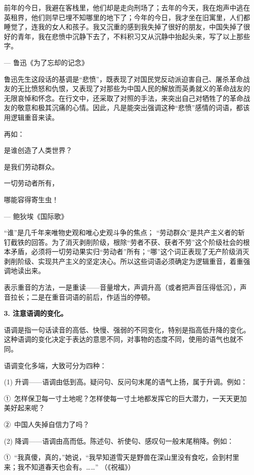 前年的今日，我避在客栈里，他们却是走向刑场了；去年的今天，我在炮声中逃在英租界，他们则早已埋不知哪里的地下了；今年的今日，我才坐在旧寓里，人们都睡觉了，连我的女人和孩子。我又沉重的感到我失掉了很好的朋友，中国失掉了很好的青年，我在悲愤中沉静下去了，不料积习又从沉静中抬起头来，写了以上那些字。
\begin{flushright}
	--- 鲁迅《为了忘却的记念》
\end{flushright}

鲁迅先生这段话的基调是“悲愤”，既表现了对国民党反动派迫害自己、屠杀革命战友的无比愤怒和仇恨，又表现了对那些为中国人民的解放而英勇就义的革命战友的无限哀悼和怀念。在行文中，还采取了对照的手法，来突出自己对牺牲了的革命战友的敬意和极其沉痛的心情。因此，凡是能突出强调这种“悲愤”感情的词语，都该用逻辑重音来读。

再如：

是谁创造了人类世界？

是我们劳动群众。

一切劳动者所有，

哪能容得寄生虫！
\begin{flushright}
	--- 鲍狄埃《国际歌》
\end{flushright}


“谁”是几千年来唯物史观和唯心史观斗争的焦点；
“劳动群众”是共产主义者的斩钉截铁的回答。为了消灭剥削阶级，根除“劳者不获、获者不劳”这个阶级社会的根本矛盾，必须将一切劳动果实归“劳动者”所有；“哪”这个词正表现了无产阶级消灭剥削阶级、实现共产主义的坚定决心。所以这些词语必须确定为逻辑重音，着重强调地读出来。

表示重音的方法，一是重读——音量增大，声调升高（或者把声音压得低沉），声音拉长；二是在重音词语的前后，作适当的停顿。

\textbf{3. 注意语调的变化。}

语调是指一句话读音的高低、快慢、强弱的不同变化，特别是指高低升降的变化。这种语调的变化决定于表达的意思不同，对事物的态度不同，使用的语气也就不同。

语调变化多端，大致可分为四种：

(1) 升调——语调由低到高。疑问句、反问句末尾的语气上扬，属于升调。例如：

①\ 怎样保卫每一寸土地呢？怎样使每一寸土地都发挥它的巨大潜力，一天天更加美好起来呢？

②\ 中国人失掉自信力了吗？

(2) 降调——语调由高而低。陈述句、祈使句、感叹句一般末尾稍降。例如：

①\ “我真傻，真的，”她说，“我早知道雪天是野兽在深山里没有食吃，会到村里来；我不知道春天也会有。……”
（《祝福》）

